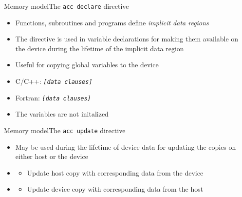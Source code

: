 \documentclass[12pt,aspectratio=169]{beamer}
\begin{document}
\begin{frame}[fragile]{Memory model}{The \texttt{acc declare} directive}
  \begin{itemize}
  \item Functions, subroutines and programs define \emph{implicit data regions}
  \item The  directive is used in variable declarations for making them available on the device during the lifetime of the implicit data region
  \item Useful for copying global variables to the device
    \vfill
  \item C/C++:  \emph{\texttt{[data clauses]}}
  \item Fortran:  \emph{\texttt{[data clauses]}}
    \vfill
  \item The variables are not initalized
  \end{itemize}
\end{frame}

\begin{frame}[fragile]{Memory model}{The \texttt{acc update} directive}
  \begin{itemize}
  \item May be used during the lifetime of device data for updating the copies on either host or the device
    \vfill
  \item {}
    \begin{itemize}
    \item Update host copy with corresponding data from the device
    \end{itemize}
    \vfill
  \item {}
    \begin{itemize}
    \item Update device copy with corresponding data from the host
    \end{itemize}
  \end{itemize}
\end{frame}
\end{document}
